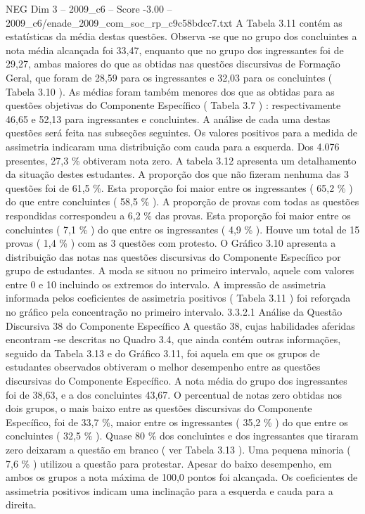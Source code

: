 \begin{textsample}{NEG Dim 3 – 2009\_c6 – Score -3.00 – 2009\_c6/enade\_2009\_com\_soc\_rp\_c9c58bdcc7.txt}
A Tabela 3.11 contém as estatísticas da média destas questões.
Observa -se que no grupo dos concluintes a nota média alcançada foi 33,47, enquanto que no grupo dos ingressantes foi de 29,27, ambas maiores do que as obtidas nas questões discursivas de Formação Geral, que foram de 28,59 para os ingressantes e 32,03 para os concluintes ( Tabela 3.10 ).
As médias foram também menores dos que as obtidas para as questões objetivas do Componente Específico ( Tabela 3.7 ) : respectivamente 46,65 e 52,13 para ingressantes e concluintes.
A análise de cada uma destas questões será feita nas subseções seguintes.
Os valores positivos para a medida de assimetria indicaram uma distribuição com cauda para a esquerda.
Dos 4.076 presentes, 27,3 \% obtiveram nota zero.
A tabela 3.12 apresenta um detalhamento da situação destes estudantes.
A proporção dos que não fizeram nenhuma das 3 questões foi de 61,5 \%.
Esta proporção foi maior entre os ingressantes ( 65,2 \% ) do que entre concluintes ( 58,5 \% ).
A proporção de provas com todas as questões respondidas correspondeu a 6,2 \% das provas.
Esta proporção foi maior entre os concluintes ( 7,1 \% ) do que entre os ingressantes ( 4,9 \% ).
Houve um total de 15 provas ( 1,4 \% ) com as 3 questões com protesto.
O Gráfico 3.10 apresenta a distribuição das notas nas questões discursivas do Componente Específico por grupo de estudantes.
A moda se situou no primeiro intervalo, aquele com valores entre 0 e 10 incluindo os extremos do intervalo.
A impressão de assimetria informada pelos coeficientes de assimetria positivos ( Tabela 3.11 ) foi reforçada no gráfico pela concentração no primeiro intervalo. 3.3.2.1 Análise da Questão Discursiva 38 do Componente Específico A questão 38, cujas habilidades aferidas encontram -se descritas no Quadro 3.4, que ainda contém outras informações, seguido da Tabela 3.13 e do Gráfico 3.11, foi aquela em que os grupos de estudantes observados obtiveram o melhor desempenho entre as questões discursivas do Componente Específico.
A nota média do grupo dos ingressantes foi de 38,63, e a dos concluintes 43,67.
O percentual de notas zero obtidas nos dois grupos, o mais baixo entre as questões discursivas do Componente Específico, foi de 33,7 \%, maior entre os ingressantes ( 35,2 \% ) do que entre os concluintes ( 32,5 \% ).
Quase 80 \% dos concluintes e dos ingressantes que tiraram zero deixaram a questão em branco ( ver Tabela 3.13 ).
Uma pequena minoria ( 7,6 \% ) utilizou a questão para protestar.
Apesar do baixo desempenho, em ambos os grupos a nota máxima de 100,0 pontos foi alcançada.
Os coeficientes de assimetria positivos indicam uma inclinação para a esquerda e cauda para a direita.

\end{textsample}
